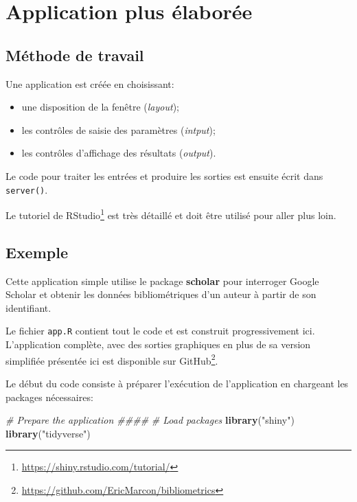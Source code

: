 \documentclass[
  12pt,
  french,
  a4paper,
  extrafontsizes,onecolumn,openright
  ]{memoir}
\newenvironment{Shaded}{\begin{snugshade}}{\end{snugshade}}
\newcommand{\CommentTok}[1]{\textcolor[rgb]{0.56,0.35,0.01}{\textit{#1}}}
\newcommand{\KeywordTok}[1]{\textcolor[rgb]{0.13,0.29,0.53}{\textbf{#1}}}
\newcommand{\NormalTok}[1]{#1}
\newcommand{\StringTok}[1]{\textcolor[rgb]{0.31,0.60,0.02}{#1}}
\providecommand{\tightlist}{%
  \setlength{\itemsep}{0pt}\setlength{\parskip}{0pt}}
\begin{document}
\hypertarget{application-plus-uxe9laboruxe9e}{%
\section{Application plus élaborée}\label{application-plus-uxe9laboruxe9e}}

\hypertarget{muxe9thode-de-travail}{%
\subsection{Méthode de travail}\label{muxe9thode-de-travail}}

Une application est créée en choisissant:

\begin{itemize}
\tightlist
\item
  une disposition de la fenêtre (\emph{layout});
\item
  les contrôles de saisie des paramètres (\emph{intput});
\item
  les contrôles d'affichage des résultats (\emph{output}).
\end{itemize}

Le code pour traiter les entrées et produire les sorties est ensuite écrit dans \texttt{server()}.

Le tutoriel de RStudio\footnote{\url{https://shiny.rstudio.com/tutorial/}} est très détaillé et doit être utilisé pour aller plus loin.

\hypertarget{exemple}{%
\subsection{Exemple}\label{exemple}}

Cette application simple utilise le package \textbf{scholar} pour interroger Google Scholar et obtenir les données bibliométriques d'un auteur à partir de son identifiant.

Le fichier \texttt{app.R} contient tout le code et est construit progressivement ici.
L'application complète, avec des sorties graphiques en plus de sa version simplifiée présentée ici est disponible sur GitHub\footnote{\url{https://github.com/EricMarcon/bibliometrics}}.

Le début du code consiste à préparer l'exécution de l'application en chargeant les packages nécessaires:

\scriptsize

\begin{Shaded}
\begin{Highlighting}[]
\CommentTok{# Prepare the application ####}
\CommentTok{# Load packages}
\KeywordTok{library}\NormalTok{(}\StringTok{"shiny"}\NormalTok{)}
\KeywordTok{library}\NormalTok{(}\StringTok{"tidyverse"}\NormalTok{)}
\end{Highlighting}
\end{Shaded}
\end{document}
